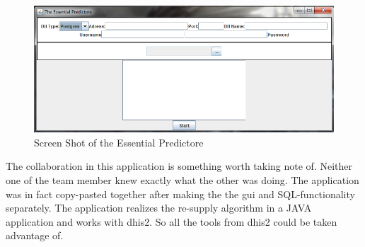 \begin{figure}
\centering
\includegraphics[width=\textwidth]{case/img/essentialPredictoreScreenShot}
\caption{Screen Shot of the Essential Predictore}
\label{fig:essPred}
\end{figure}

The collaboration in this application is something worth taking note of. Neither one of the team member knew exactly what the other was doing. The application was in fact copy-pasted together after making the the \gls{gui} and SQL-functionality separately. The application realizes the re-supply algorithm in a JAVA application and works with \gls{dhis2}. So all the tools from \gls{dhis2} could be taken advantage of. 
